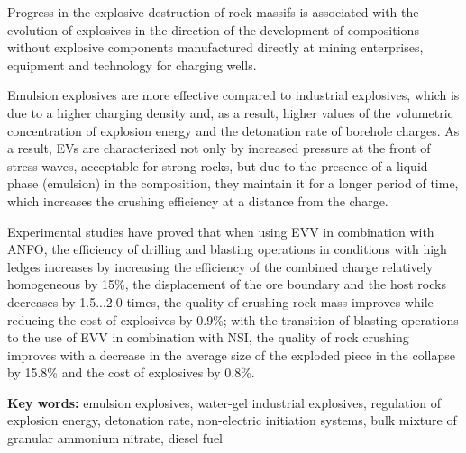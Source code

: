 Progress in the explosive destruction of rock massifs is associated with
the evolution of explosives in the direction of the development of
compositions without explosive components manufactured directly at
mining enterprises, equipment and technology for charging wells.

Emulsion explosives are more effective compared to industrial
explosives, which is due to a higher charging density and, as a result,
higher values of the volumetric concentration of explosion energy and
the detonation rate of borehole charges. As a result, EVs are
characterized not only by increased pressure at the front of stress
waves, acceptable for strong rocks, but due to the presence of a liquid
phase (emulsion) in the composition, they maintain it for a longer
period of time, which increases the crushing efficiency at a distance
from the charge.

Experimental studies have proved that when using EVV in combination with
ANFO, the efficiency of drilling and blasting operations in conditions
with high ledges increases by increasing the efficiency of the combined
charge relatively homogeneous by 15\%, the displacement of the ore
boundary and the host rocks decreases by 1.5...2.0 times, the quality of
crushing rock mass improves while reducing the cost of explosives by
0.9\%; with the transition of blasting operations to the use of EVV in
combination with NSI, the quality of rock crushing improves with a
decrease in the average size of the exploded piece in the collapse by
15.8\% and the cost of explosives by 0.8\%.

{\bfseries Key words:} emulsion explosives, water-gel industrial
explosives, regulation of explosion energy, detonation rate,
non-electric initiation systems, bulk mixture of granular ammonium
nitrate, diesel fuel


